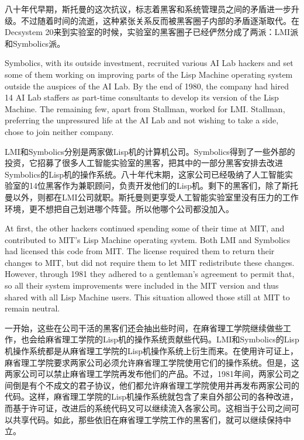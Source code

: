 \ifdefined\chs
八十年代早期，斯托曼的这次抗议，标志着黑客和系统管理员之间的矛盾进一步升级。不过随着时间的流逝，这种紧张关系反而被黑客圈子内部的矛盾逐渐取代。在Decsystem 20来到实验室的时候，实验室的黑客圈子已经俨然分成了两派：LMI派和Symbolics派。
\fi

\ifdefined\eng
Symbolics, with its outside investment, recruited various AI Lab hackers and set some of them working on improving parts of the Lisp Machine operating system outside the auspices of the AI Lab. By the end of 1980, the company had hired 14 AI Lab staffers as part-time consultants to develop its version of the Lisp Machine. The remaining few, apart from Stallman, worked for LMI.  Stallman, preferring the unpressured life at the AI Lab and not wishing to take a side, chose to join neither company.
\fi

\ifdefined\chs
LMI和Symbolics分别是两家做Lisp机的计算机公司。Symbolics得到了一些外部的投资，它招募了很多人工智能实验室的黑客，把其中的一部分黑客安排去改进Symbolics的Lisp机的操作系统。八十年代末期，这家公司已经吸纳了人工智能实验室的14位黑客作为兼职顾问，负责开发他们的Lisp机。剩下的黑客们，除了斯托曼以外，则都在LMI公司就职。斯托曼则更享受人工智能实验室里没有压力的工作环境，更不想把自己划进哪个阵营。所以他哪个公司都没加入。
\fi

\ifdefined\eng
At first, the other hackers continued spending some of their time at MIT, and contributed to MIT's Lisp Machine operating system. Both LMI and Symbolics had licensed this code from MIT. The license required them to return their changes to MIT, but did not require them to let MIT redistribute these changes.  However, through 1981 they adhered to a gentleman's agreement to permit that, so all their system improvements were included in the MIT version and thus shared with all Lisp Machine users. This situation allowed those still at MIT to remain neutral.
\fi

\ifdefined\chs
一开始，这些在公司干活的黑客们还会抽出些时间，在麻省理工学院继续做些工作，也会给麻省理工学院的Lisp机的操作系统贡献些代码。LMI和Symbolics的Lisp机操作系统都是从麻省理工学院的Lisp机操作系统上衍生而来。在使用许可证上，麻省理工学院要求两家公司必须允许麻省理工学院使用它们的操作系统。但是，这两家公司可以禁止麻省理工学院再发布他们的产品。不过，1981年间，两家公司之间倒是有个不成文的君子协议，他们都允许麻省理工学院使用并再发布两家公司的代码。这样，麻省理工学院的Lisp机操作系统就包含了来自外部公司的各种改进，而基于许可证，改进后的系统代码又可以继续流入各家公司。这相当于公司之间可以共享代码。如此，那些依旧在麻省理工学院工作的黑客们，就可以继续保持中立。
\fi

